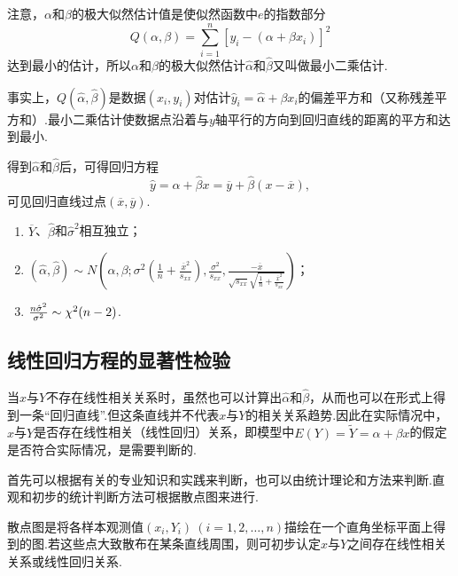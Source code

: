 注意，\(\alpha\)和\(\beta\)的极大似然估计值是使似然函数中\(e\)的指数部分\begin{equation*}
Q(\alpha,\beta) = \sum_{i=1}^n[y_i-(\alpha+\beta x_i)]^2
\end{equation*}达到最小的估计，所以\(\alpha\)和\(\beta\)的极大似然估计\(\hat{\alpha}\)和\(\hat{\beta}\)又叫做最小二乘估计.

事实上，\(Q(\hat{\alpha},\hat{\beta})\)是数据\((x_i,y_i)\)对估计\(\hat{y}_i=\hat{\alpha}+\beta x_i\)的偏差平方和（又称残差平方和）.最小二乘估计使数据点沿着与\(y\)轴平行的方向到回归直线的距离的平方和达到最小.

得到\(\hat{\alpha}\)和\(\hat{\beta}\)后，可得回归方程\begin{equation*}
\hat{y} = \hat{\alpha} + \hat{\beta} x
= \overline{y} + \hat{\beta} (x - \overline{x}),
\end{equation*}可见回归直线过点\((\overline{x},\overline{y})\).

\begin{theorem}
\begin{enumerate}
\item \(\overline{Y}\)、\(\hat{\beta}\)和\(\hat{\sigma}^2\)相互独立；
\item \((\hat{\alpha},\hat{\beta}) \sim N\left(
	\alpha, \beta;
	\sigma^2 \left( \frac{1}{n} + \frac{\overline{x}^2}{s_{xx}} \right),
	\frac{\sigma^2}{s_{xx}},
	\frac{-\overline{x}}{
		\sqrt{s_{xx}} \sqrt{\frac{1}{n} + \frac{\overline{x}^2}{s_{xx}}}
	}
\right)\)；
\item \(\frac{n \hat{\sigma}^2}{\sigma^2} \sim \chi^2(n-2)\).
\end{enumerate}
\end{theorem}

\subsection{线性回归方程的显著性检验}
当\(x\)与\(Y\)不存在线性相关关系时，虽然也可以计算出\(\hat{\alpha}\)和\(\hat{\beta}\)，从而也可以在形式上得到一条“回归直线”.但这条直线并不代表\(x\)与\(Y\)的相关关系趋势.因此在实际情况中，\(x\)与\(Y\)是否存在线性相关（线性回归）关系，即模型中\(E(Y) = \widetilde{Y} = \alpha + \beta x\)的假定是否符合实际情况，是需要判断的.

首先可以根据有关的专业知识和实践来判断，也可以由统计理论和方法来判断.直观和初步的统计判断方法可根据散点图来进行.

散点图是将各样本观测值\((x_i,Y_i)\ (i=1,2,\dotsc,n)\)描绘在一个直角坐标平面上得到的图.若这些点大致散布在某条直线周围，则可初步认定\(x\)与\(Y\)之间存在线性相关关系或线性回归关系.

